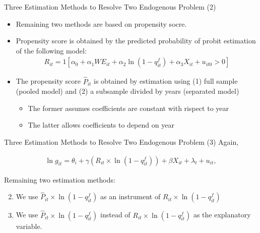 \documentclass[
  ignorenonframetext,
  aspectratio=169,
]{beamer}
\providecommand{\tightlist}{%
  \setlength{\itemsep}{0pt}\setlength{\parskip}{0pt}}
\begin{document}
\begin{frame}{Three Estimation Methods to Resolve Two Endogenous Problem (2)}
\protect\hypertarget{three-estimation-methods-to-resolve-two-endogenous-problem-2}{}
\begin{itemize}
\item
  Remaining two methods are based on propensity socre.
\item
  Propensity score is obtained by the predicted probability of probit estimation of the following model:
  \begin{align}
  R_{it} = 1[
    \alpha_0 + \alpha_1 WE_{it} + \alpha_2 \ln(1 - q^f_{it})
    + \alpha_3 X_{it} + u_{it0} > 0
  ] \label{eq:selection}
  \end{align}
\item
  The propensity score \(\hat{P}_{it}\) is obtained by estimation using (1) full sample (pooled model)
  and (2) a subsample divided by years (separated model)

  \begin{itemize}
  \tightlist
  \item
    The former assumes coefficients are constant with rispect to year
  \item
    The latter allows coefficients to depend on year
  \end{itemize}
\end{itemize}
\end{frame}

\begin{frame}{Three Estimation Methods to Resolve Two Endogenous Problem (3)}
\protect\hypertarget{three-estimation-methods-to-resolve-two-endogenous-problem-3}{}
Again,

\begin{align*}
  \ln g_{it} = \theta_i + \gamma (R_{it} \times \ln (1 - q^f_{it}))
    + \beta X_{it} + \lambda_t + u_{it},
\end{align*}

Remaining two estimation methods:

\begin{enumerate}
\setcounter{enumi}{1}
\tightlist
\item
  We use \(\hat{P}_{it} \times \ln (1 - q^f_{it})\) as an instrument of \(R_{it} \times \ln (1 - q^f_{it})\)
\item
  We use \(\hat{P}_{it} \times \ln (1 - q^f_{it})\) instead of \(R_{it} \times \ln (1 - q^f_{it})\) as the explanatory variable.
\end{enumerate}
\end{frame}
\end{document}
